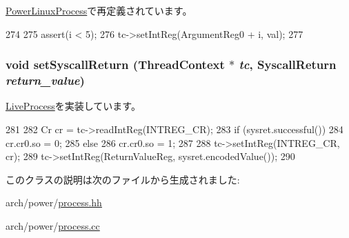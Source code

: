 \hyperlink{classPowerLinuxProcess_a1e515b39cc799824d1dd93d40ba28416}{PowerLinuxProcess}で再定義されています。


\begin{DoxyCode}
274 {
275     assert(i < 5);
276     tc->setIntReg(ArgumentReg0 + i, val);
277 }
\end{DoxyCode}
\hypertarget{classPowerLiveProcess_aaefd02663c1eae206b851290d9276a5e}{
\subsubsection[{setSyscallReturn}]{\setlength{\rightskip}{0pt plus 5cm}void setSyscallReturn ({\bf ThreadContext} $\ast$ {\em tc}, \/  {\bf SyscallReturn} {\em return\_\-value})}}
\label{classPowerLiveProcess_aaefd02663c1eae206b851290d9276a5e}


\hyperlink{classLiveProcess_a5955e790542b86589b9fd75df24ec2d3}{LiveProcess}を実装しています。


\begin{DoxyCode}
281 {
282     Cr cr = tc->readIntReg(INTREG_CR);
283     if (sysret.successful()) {
284         cr.cr0.so = 0;
285     } else {
286         cr.cr0.so = 1;
287     }
288     tc->setIntReg(INTREG_CR, cr);
289     tc->setIntReg(ReturnValueReg, sysret.encodedValue());
290 }
\end{DoxyCode}


このクラスの説明は次のファイルから生成されました:\begin{DoxyCompactItemize}
\item 
arch/power/\hyperlink{arch_2power_2process_8hh}{process.hh}\item 
arch/power/\hyperlink{arch_2power_2process_8cc}{process.cc}\end{DoxyCompactItemize}
